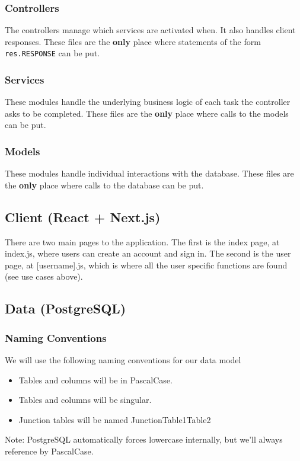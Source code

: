 \documentclass{article}
\begin{document}
\subsubsection*{Controllers}
The controllers manage which services are activated when. It also handles client responses. These files are the \textbf{only} place where statements of the form \texttt{res.RESPONSE} can be put.

\subsubsection*{Services}
These modules handle the underlying business logic of each task the controller asks to be completed. These files are the \textbf{only} place where calls to the models can be put.

\subsubsection*{Models}
These modules handle individual interactions with the database. These files are the \textbf{only} place where calls to the database can be put.

\subsection{Client (React + Next.js)}
There are two main pages to the application. The first is the index page, at index.js, where users can create an account and sign in. The second is the user page, at [username].js, which is where all the user specific functions are found (see use cases above).

\subsection{Data (PostgreSQL)}
\subsubsection*{Naming Conventions}
We will use the following naming conventions for our data model
\begin{itemize}
    \item Tables and columns will be in PascalCase.
    \item Tables and columns will be singular.
    \item Junction tables will be named JunctionTable1Table2
\end{itemize}
Note: PostgreSQL automatically forces lowercase internally, but we'll always reference by PascalCase.
\end{document}
